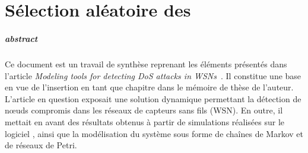 \chapter{Sélection aléatoire des \cns}

\renewcommand\chapterpath{Main/SelecAleatoire}
\renewcommand\chapterfig{Main/SelecAleatoire/Figures}


\paragraph{abstract}
Ce document est un travail de synthèse reprenant les éléments présentés dans l'article \textit{Modeling tools for detecting DoS attacks in WSNs}~\cite{BMM13}.
Il constitue une base en vue de l'insertion en tant que chapitre dans le mémoire de thèse de l'auteur.\\

L'article en question exposait une solution dynamique permettant la détection de nœuds compromis dans les réseaux de capteurs sans fils (WSN).
En outre, il mettait en avant des résultats obtenus à partir de simulations réalisées sur le logiciel \ns, ainsi que la modélisation du système sous forme de chaînes de Markov et de réseaux de Petri.\\

